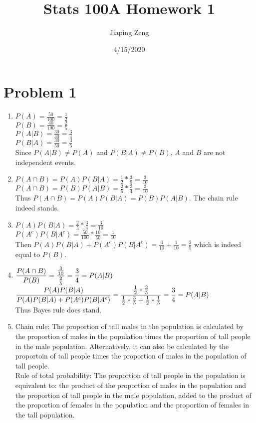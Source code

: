 \documentclass{article}
\title{Stats 100A Homework 1}
\author{Jiaping Zeng}
\date{4/15/2020}
\begin{document}
\maketitle

\section*{Problem 1}
\begin{enumerate}
    \item
          $P(A)=\frac{50}{100}=\frac{1}{2}$\\
          $P(B)=\frac{40}{100}=\frac{2}{5}$\\
          $P(A|B)=\frac{30}{40}=\frac{3}{4}$\\
          $P(B|A)=\frac{30}{50}=\frac{3}{5}$\\
          Since $P(A|B)\neq P(A)$ and $P(B|A)\neq P(B)$, $A$ and $B$ are not independent events.
    \item
          $P(A\cap B)=P(A)P(B|A)=\frac{1}{2}*\frac{3}{5}=\frac{3}{10}$\\
          $P(A\cap B)=P(B)P(A|B)=\frac{2}{5}*\frac{3}{4}=\frac{3}{10}$\\
          Thus $P(A\cap B)=P(A)P(B|A)=P(B)P(A|B)$. The chain rule indeed stands.
    \item
          $P(A)P(B|A)=\frac{2}{5}*\frac{3}{4}=\frac{3}{10}$\\
          $P(A^c)P(B|A^c)=\frac{50}{100}*\frac{10}{50}=\frac{1}{10}$\\
          Then $P(A)P(B|A)+P(A^c)P(B|A^c)=\frac{3}{10}+\frac{1}{10}=\frac{2}{5}$ which is indeed equal to $P(B)$.
    \item
          $\mathlarger{\frac{P(A\cap B)}{P(B)}=\frac{\frac{3}{10}}{\frac{2}{5}}=\frac{3}{4}=P(A|B)}$\\
          $\mathlarger{\frac{P(A)P(B|A)}{P(A)P(B|A)+P(A^c)P(B|A^c)}=\frac{\frac{1}{2}*\frac{3}{5}}{\frac{1}{2}*\frac{3}{5}+\frac{1}{2}*\frac{1}{5}}=\frac{3}{4}=P(A|B)}$\\
          Thus Bayes rule does stand.
    \item
          Chain rule: The proportion of tall males in the population is calculated by the proportion of males in the population times the proportion of tall people in the male population. Alternatively, it can also be calculated by the proportoin of tall people times the proportion of males in the population of tall people.\\
          Rule of total probability: The proportion of tall people in the population is equivalent to: the product of the proportion of males in the population and the proportion of tall people in the male population, added to the product of the proportion of females in the population and the proportion of females in the tall population.\\

\end{enumerate}
\end{document}
